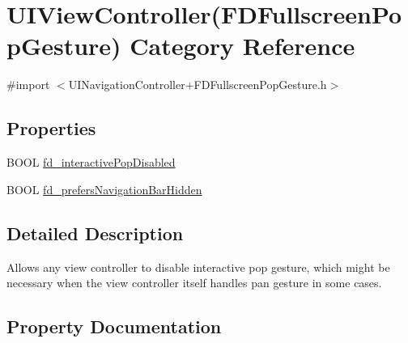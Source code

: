 \hypertarget{category_u_i_view_controller_07_f_d_fullscreen_pop_gesture_08}{}\section{U\+I\+View\+Controller(F\+D\+Fullscreen\+Pop\+Gesture) Category Reference}
\label{category_u_i_view_controller_07_f_d_fullscreen_pop_gesture_08}


{\ttfamily \#import $<$U\+I\+Navigation\+Controller+\+F\+D\+Fullscreen\+Pop\+Gesture.\+h$>$}

\subsection*{Properties}
\begin{DoxyCompactItemize}
\item 
B\+O\+OL \mbox{\hyperlink{category_u_i_view_controller_07_f_d_fullscreen_pop_gesture_08_acf4f5bff563baba9e08a36eb19227888}{fd\+\_\+interactive\+Pop\+Disabled}}
\item 
B\+O\+OL \mbox{\hyperlink{category_u_i_view_controller_07_f_d_fullscreen_pop_gesture_08_a03f28adb658220a67d59f687ef9c583d}{fd\+\_\+prefers\+Navigation\+Bar\+Hidden}}
\end{DoxyCompactItemize}


\subsection{Detailed Description}
Allows any view controller to disable interactive pop gesture, which might be necessary when the view controller itself handles pan gesture in some cases. 

\subsection{Property Documentation}
\mbox{\label{category_u_i_view_controller_07_f_d_fullscreen_pop_gesture_08_acf4f5bff563baba9e08a36eb19227888}} 
